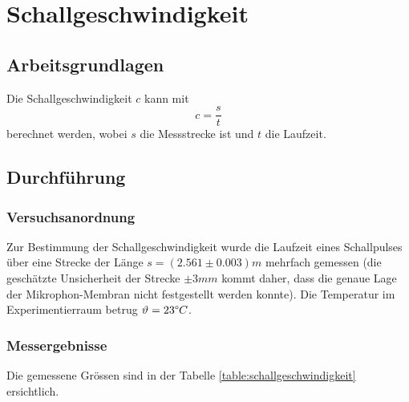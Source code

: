 \section{Schallgeschwindigkeit}

\subsection{Arbeitsgrundlagen}

Die Schallgeschwindigkeit $c$ kann mit
\begin{equation}
    c=\frac{s}{t}
    \label{eq:schallgeschwindigkeit}
\end{equation}
berechnet werden, wobei $s$ die Messstrecke ist und $t$ die Laufzeit.


\subsection{Durchf\"{u}hrung}

\subsubsection*{Versuchsanordnung}

Zur Bestimmung der Schallgeschwindigkeit wurde die Laufzeit eines Schallpulses \"{u}ber eine Strecke
der L\"{a}nge $s = (2.561 \pm 0.003) m$ mehrfach gemessen (die gesch\"{a}tzte Unsicherheit der Strecke $\pm 3 mm$
kommt daher, dass die genaue Lage der Mikrophon-Membran nicht festgestellt werden konnte). Die
Temperatur im Experimentierraum betrug $\vartheta=23 \degree C$.


\subsubsection*{Messergebnisse}

Die gemessene Gr\"ossen sind in der Tabelle \ref{table:schallgeschwindigkeit} ersichtlich.

